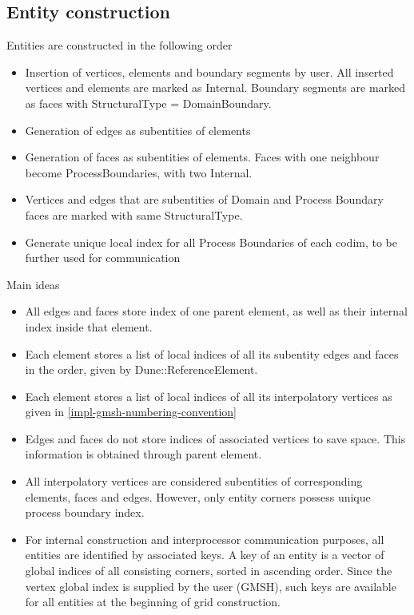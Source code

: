 \subsection{Entity construction}
\label{impl-grid-constructor-entity}

Entities are constructed in the following order
\begin{itemize}
	\item Insertion of vertices, elements and boundary segments by user. All inserted vertices and elements are marked as Internal. Boundary segments are marked as faces with StructuralType = DomainBoundary.
	\item Generation of edges as subentities of elements
	\item Generation of faces as subentities of elements. Faces with one neighbour become ProcessBoundaries, with two Internal.
	\item Vertices and edges that are subentities of Domain and Process Boundary faces are marked with same StructuralType.
	\item Generate unique local index for all Process Boundaries of each codim, to be further used for communication
\end{itemize}

Main ideas
\begin{itemize}
	\item All edges and faces store index of one parent element, as well as their internal index inside that element.
	\item Each element stores a list of local indices of all its subentity edges and faces in the order, given by Dune::ReferenceElement.
	\item Each element stores a list of local indices of all its interpolatory vertices as given in \ref{impl-gmsh-numbering-convention}
	\item Edges and faces do not store indices of associated vertices to save space. This information is obtained through parent element.
	\item All interpolatory vertices are considered subentities of corresponding elements, faces and edges. However, only entity corners possess unique process boundary index.
	\item For internal construction and interprocessor communication purposes, all entities are identified by associated keys. A key of an entity is a vector of global indices of all consisting corners, sorted in ascending order. Since the vertex global index is supplied by the user (GMSH), such keys are available for all entities at the beginning of grid construction.
\end{itemize}




